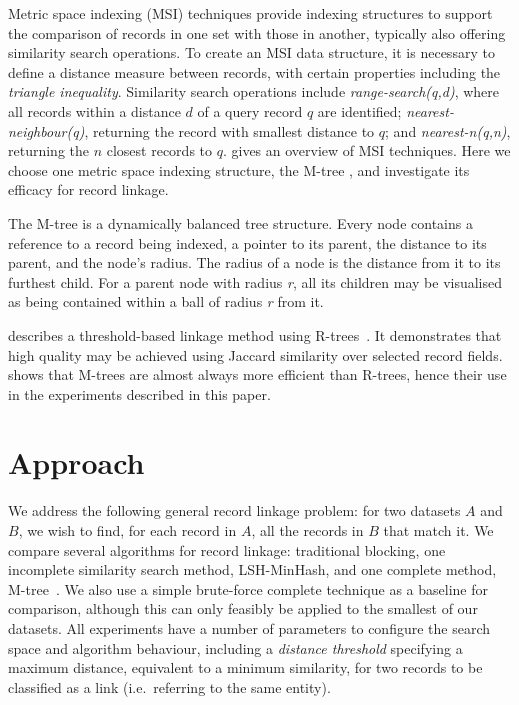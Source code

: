 \documentclass{llncs}
\begin{document}
Metric space indexing (MSI) techniques provide indexing structures to
support the comparison of records in one set with those in another,
typically also offering similarity search operations. To create an MSI
data structure, it is necessary to define a distance measure between
records, with certain properties including the \emph{triangle
inequality}. Similarity search operations include
\textit{range-search(q,d)}, where all records within a distance $d$ of a
query record $q$ are identified; \textit{nearest-neighbour(q)},
returning the record with smallest distance to $q$; and
\textit{nearest-n(q,n)}, returning the $n$ closest records to $q$.
\cite{Zezula2010} gives an overview of MSI techniques.
Here we choose one metric space indexing structure, the M-tree
\cite{paolociaccia2m}, and investigate its efficacy for record linkage.

The M-tree is a dynamically balanced tree structure. Every node contains
a reference to a record being indexed, a pointer to its parent, the
distance to its parent, and the node's radius. The radius of a node is
the distance from it to its furthest child. For a parent node with
radius \textit{r}, all its children may be visualised as being contained
within a ball of radius \textit{r} from it.

\cite{Li2006} describes a threshold-based linkage method
using R-trees~\cite{Hjaltason1998}. It demonstrates that high quality
may be achieved using Jaccard similarity over selected record fields.
\cite{Ciaccia97indexingmetric} shows that M-trees are
almost always more efficient than R-trees, hence their use in the
experiments described in this paper.


\section{Approach}
\label{sec-approach}

We address the following general record linkage problem: for two
datasets $A$ and $B$, we wish to find, for each record in $A$, all the
records in $B$ that match it. We compare several algorithms for record
linkage: traditional blocking, one incomplete similarity search method,
LSH-MinHash, and one complete method, M-tree~\cite{paolociaccia2m}. We
also use a simple brute-force complete technique as a baseline for
comparison, although this can only feasibly be applied to the smallest
of our datasets. All experiments have a number of parameters to
configure the search space and algorithm behaviour, including a
\emph{distance threshold} specifying a maximum distance, equivalent to a
minimum similarity, for two records to be classified as a link (i.e.\
referring to the same entity).
\end{document}
